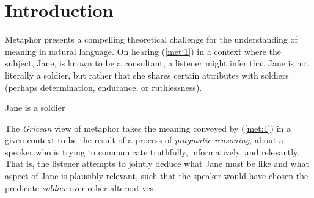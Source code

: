 \documentclass[OpenMind]{stjour}
\begin{document}
\begin{abstract}


	\end{abstract}
\section{Introduction}

	Metaphor presents a compelling theoretical challenge for the understanding of meaning in natural language. On hearing (\ref{met:1}) in a context where the subject, Jane, is known to be a consultant, a listener might infer that Jane is not literally a soldier, but rather that she shares certain attributes with soldiers (perhaps determination, endurance, or ruthlessness). 
	\begin{exe}
	\ex Jane is a soldier \label{met:1}
	\end{exe}
	The \emph{Gricean} view of metaphor takes the meaning conveyed by (\ref{met:1}) in a given context to be the result of a process of \emph{pragmatic reasoning}, about a speaker who is trying to communicate truthfully, informatively, and relevantly. That is, the listener attempts to jointly deduce what Jane must be like and what aspect of Jane is plausibly relevant, such that the speaker would have chosen the predicate \emph{soldier} over other alternatives.

\end{document}
